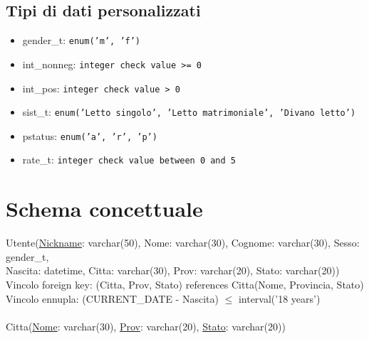 \documentclass[a4paper,12pt]{report}
\begin{document}
      \section*{Tipi di dati personalizzati}
      \begin{itemize}
        \item gender\_t: \texttt{enum('m', 'f')}
        \item int\_nonneg: \texttt{integer check value >= 0}
        \item int\_pos: \texttt{integer check value > 0}
        \item sist\_t: \texttt{enum('Letto singolo', 'Letto matrimoniale', 'Divano letto')}
        \item pstatus: \texttt{enum('a', 'r', 'p')}
        \item rate\_t: \texttt{integer check value between 0 and 5}
      \end{itemize}

    \chapter*{Schema concettuale}
      Utente(\underline{Nickname}: varchar(50), Nome: varchar(30), Cognome: varchar(30), Sesso: gender\_t, \\
      \hspace*{2cm} Nascita: datetime, Citta: varchar(30), Prov: varchar(20), Stato: varchar(20)) \\
      \hspace*{1cm} Vincolo foreign key: (Citta, Prov, Stato) references Citta(Nome, Provincia, Stato) \\
      \hspace*{1cm} Vincolo ennupla: (CURRENT\_DATE - Nascita) $\leq$ interval('18 years') \\ \\
  
      \hspace*{-0.75cm}
      Citta(\underline{Nome}: varchar(30), \underline{Prov}: varchar(20), \underline{Stato}: varchar(20)) \\ \\
\end{document}
